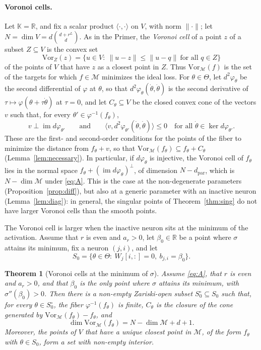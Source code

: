 \documentclass[11pt]{article}
\newtheorem{maintheorem}{Theorem}
\theoremstyle{definition}
\theoremstyle{remark}
\newcommand{\K}{\mathbb{K}}
\newcommand{\R}{\mathbb{R}}
\newcommand{\M}{\mathcal{M}}
\newcommand{\dpar}{d_{\mathrm{par}}}
\begin{document}
\paragraph{Voronoi cells.} Let $\K=\R$, and fix a scalar product $\langle\cdot,\cdot\rangle$ on $V$, with norm $\|\cdot\|$; let $N=\dim V=d\binom{d+r^L}{d}$. As in the Primer, the \emph{Voronoi cell} of a point $z$ of a subset $Z\subseteq V$ is the convex set
\[
\mathrm{Vor}_Z(z)=\{u\in V:\ \|u-z\|\le\|u-q\|\ \text{for all }q\in Z\}
\]
of the points of $V$ that have $z$ as a closest point in $Z$. Thus $\mathrm{Vor}_{\M}(f)$ is the set of the targets for which $f\in\M$ minimizes the ideal loss. For $\theta\in\Theta$, let $d^2\varphi_\theta$ be the second differential of $\varphi$ at $\theta$, so that $d^2\varphi_\theta(\dot\theta,\dot\theta)$ is the second derivative of $\tau\mapsto\varphi(\theta+\tau\dot\theta)$ at $\tau=0$, and let $C_\theta\subseteq V$ be the closed convex cone of the vectors $v$ such that, for every $\theta'\in\varphi^{-1}(f_\theta)$,
\begin{equation}\label{eq:cone}
v\perp\operatorname{im}d\varphi_{\theta'}\qquad\text{and}\qquad\langle v,d^2\varphi_{\theta'}(\dot\theta,\dot\theta)\rangle\le0\quad\text{for all }\dot\theta\in\ker d\varphi_{\theta'}.
\end{equation}
These are the first- and second-order conditions for the points of the fiber to minimize the distance from $f_\theta+v$, so that $\mathrm{Vor}_{\M}(f_\theta)\subseteq f_\theta+C_\theta$ (Lemma~\ref{lem:necessary}). In particular, if $d\varphi_\theta$ is injective, the Voronoi cell of $f_\theta$ lies in the normal space $f_\theta+(\operatorname{im}d\varphi_\theta)^\perp$, of dimension $N-\dpar$, which is $N-\dim\M$ under \eqref{eq:A}. This is the case at the non-degenerate parameters (Proposition~\ref{prop:diff}), but also at a generic parameter with an inactive neuron (Lemma~\ref{lem:diag}): in general, the singular points of Theorem~\ref{thm:sing} do not have larger Voronoi cells than the smooth points.

The Voronoi cell is larger when the inactive neuron sits at the minimum of the activation. Assume that $r$ is even and $a_r>0$, let $\beta_0\in\R$ be a point where $\sigma$ attains its minimum, fix a neuron $(j,i)$, and let
\[
S_0=\{\theta\in\Theta:\ W_j[i,:]=0,\ b_{j,i}=\beta_0\}.
\]

\begin{maintheorem}[Voronoi cells at the minimum of $\sigma$]\label{thm:voronoi}
Assume \eqref{eq:A}, that $r$ is even and $a_r>0$, and that $\beta_0$ is the only point where $\sigma$ attains its minimum, with $\sigma''(\beta_0)>0$. Then there is a non-empty Zariski-open subset $S_0^\circ\subseteq S_0$ such that, for every $\theta\in S_0^\circ$, the fiber $\varphi^{-1}(f_\theta)$ is finite, $C_\theta$ is the closure of the cone generated by $\mathrm{Vor}_{\M}(f_\theta)-f_\theta$, and
\[
\dim\mathrm{Vor}_{\M}(f_\theta)=N-\dim\M+d+1.
\]
Moreover, the points of $V$ that have a unique closest point in $\M$, of the form $f_\theta$ with $\theta\in S_0$, form a set with non-empty interior.
\end{maintheorem}
\end{document}
